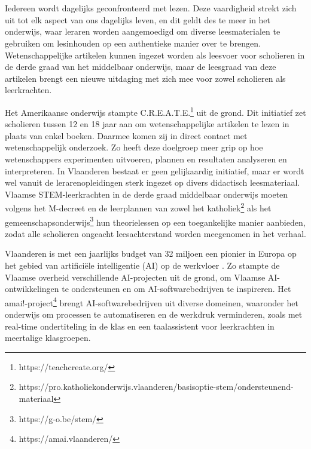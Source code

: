 
\chapter{}%
\label{ch:inleiding}

Iedereen wordt dagelijks geconfronteerd met lezen. Deze vaardigheid strekt zich uit tot elk aspect van ons dagelijks leven, en dit geldt des te meer in het onderwijs, waar leraren worden aangemoedigd om diverse leesmaterialen te gebruiken om lesinhouden op een authentieke manier over te brengen. Wetenschappelijke artikelen kunnen ingezet worden als leesvoer voor scholieren in de derde graad van het middelbaar onderwijs, maar de leesgraad van deze artikelen brengt een nieuwe uitdaging met zich mee voor zowel scholieren als leerkrachten. 

\medspace

Het Amerikaanse onderwijs stampte C.R.E.A.T.E.\footnote{https://teachcreate.org/} uit de grond. Dit initiatief zet scholieren tussen 12 en 18 jaar aan om wetenschappelijke artikelen te lezen in plaats van enkel boeken. Daarmee komen zij in direct contact met wetenschappelijk onderzoek. Zo heeft deze doelgroep meer grip op hoe wetenschappers experimenten uitvoeren, plannen en resultaten analyseren en interpreteren. In Vlaanderen bestaat er geen gelijkaardig initiatief, maar er wordt wel vanuit de lerarenopleidingen sterk ingezet op divers didactisch leesmateriaal. Vlaamse STEM-leerkrachten in de derde graad middelbaar onderwijs moeten volgens het M-decreet en de leerplannen van zowel het katholiek\footnote{https://pro.katholiekonderwijs.vlaanderen/basisoptie-stem/ondersteunend-materiaal} als het gemeenschapsonderwijs\footnote{https://g-o.be/stem/} hun theorielessen op een toegankelijke manier aanbieden, zodat alle scholieren ongeacht leesachterstand worden meegenomen in het verhaal. 

\medspace

Vlaanderen is met een jaarlijks budget van 32 miljoen een pionier in Europa op het gebied van artificiële intelligentie (AI) op de werkvloer \autocite{Crevits2022}. Zo stampte de Vlaamse overheid verschillende AI-projecten uit de grond, om Vlaamse AI-ontwikkelingen te ondersteunen en om AI-softwarebedrijven te inspireren. Het amai!-project\footnote{https://amai.vlaanderen/} brengt AI-softwarebedrijven uit diverse domeinen, waaronder het onderwijs om processen te automatiseren en de werkdruk verminderen, zoals met real-time ondertiteling in de klas en een taalassistent voor leerkrachten in meertalige klasgroepen.


